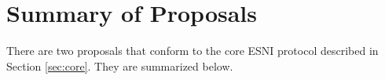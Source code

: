 \documentclass{article}
\newcommand{\adv}{{\sf Adv}}
\theoremstyle{definition}
\begin{document}

\section{Summary of Proposals}

There are two proposals that conform to the core ESNI protocol described in Section \ref{sec:core}. 
They are summarized below.
\end{document}

